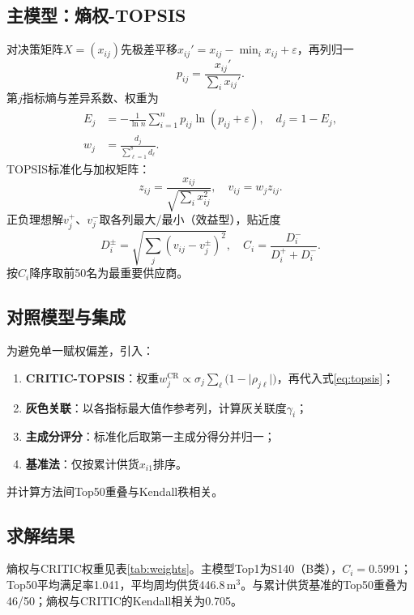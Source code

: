 \documentclass[12pt,a4paper]{ctexart}
\begin{document}
\subsection{主模型：熵权-TOPSIS}
对决策矩阵$X=(x_{ij})$先极差平移$x_{ij}'=x_{ij}-\min_i x_{ij}+\varepsilon$，再列归一
\begin{equation}
p_{ij}=\frac{x_{ij}'}{\sum_{i}x_{ij}'}.
\end{equation}
第$j$指标熵与差异系数、权重为
\begin{align}
E_j&=-\frac{1}{\ln n}\sum_{i=1}^{n}p_{ij}\ln(p_{ij}+\varepsilon),\quad
d_j=1-E_j,\\
w_j&=\frac{d_j}{\sum_{\ell=1}^{8}d_\ell}.
\end{align}
TOPSIS标准化与加权矩阵：
\begin{equation}
z_{ij}=\frac{x_{ij}}{\sqrt{\sum_i x_{ij}^2}},\quad
v_{ij}=w_j z_{ij}.
\end{equation}
正负理想解$v_j^+$、$v_j^-$取各列最大/最小（效益型），贴近度
\begin{equation}
\label{eq:topsis}
D_i^\pm=\sqrt{\sum_j(v_{ij}-v_j^\pm)^2},\quad
C_i=\frac{D_i^-}{D_i^++D_i^-}.
\end{equation}
按$C_i$降序取前50名为最重要供应商。

\subsection{对照模型与集成}
为避免单一赋权偏差，引入：
\begin{enumerate}[leftmargin=2em]
\item \textbf{CRITIC-TOPSIS}：权重$w_j^{\mathrm{CR}}\propto \sigma_j\sum_{\ell}\bigl(1-\lvert\rho_{j\ell}\rvert\bigr)$，再代入式\eqref{eq:topsis}；
\item \textbf{灰色关联}：以各指标最大值作参考列，计算灰关联度$\gamma_i$；
\item \textbf{主成分评分}：标准化后取第一主成分得分并归一；
\item \textbf{基准法}：仅按累计供货$x_{i1}$排序。
\end{enumerate}
并计算方法间Top50重叠与Kendall秩相关。

\subsection{求解结果}
熵权与CRITIC权重见表\ref{tab:weights}。主模型Top1为S140（B类），$C_i=0.5991$；Top50平均满足率1.041，平均周均供货446.8\,m$^3$。与累计供货基准的Top50重叠为46/50；熵权与CRITIC的Kendall相关为0.705。
\end{document}
